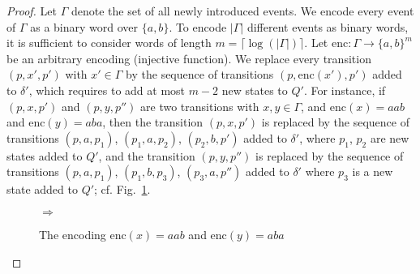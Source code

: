 \documentclass[twocolumn,amsthm]{autartx}
\begin{document}
\begin{proof}
    Let $\Gamma$ denote the set of all newly introduced events. We encode every event of $\Gamma$ as a binary word over $\{a,b\}$. To encode $|\Gamma|$ different events as binary words, it is sufficient to consider words of length $m=\lceil \log(|\Gamma|) \rceil$. Let $\text{enc}\colon \Gamma \to \{a,b\}^{m}$ be an arbitrary encoding (injective function). We replace every transition $(p,x',p')$ with $x'\in\Gamma$ by the sequence of transitions $(p,\text{enc}(x'),p')$ added to $\delta'$, which requires to add at most $m-2$ new states to $Q'$. 
%     
    For instance, if $(p,x,p')$ and $(p,y,p'')$ are two transitions with $x,y\in\Gamma$, and $\text{enc}(x)=aab$ and $\text{enc}(y)=aba$, then the transition $(p,x,p')$ is replaced by the sequence of transitions $(p,a,p_1)$, $(p_1,a,p_2)$, $(p_2,b,p')$ added to $\delta'$, where $p_1$, $p_2$ are new states added to $Q'$, and the transition $(p,y,p'')$ is replaced by the sequence of transitions $(p,a,p_1)$, $(p_1,b,p_3)$, $(p_3,a,p'')$ added to $\delta'$ where $p_3$ is a new state added to $Q'$; cf. Fig.~\ref{fig6}. 
    \begin{figure}
      \centering
      \quad $\Longrightarrow$ \quad
      \caption{The encoding $\text{enc}(x)=aab$ and $\text{enc}(y)=aba$}
      \label{fig6}
    \end{figure}


\end{proof}
\end{document}
